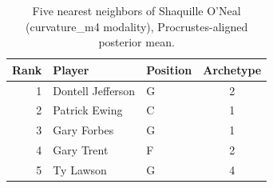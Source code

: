 \begin{table}[htbp]
  \centering\small
  \begin{tabular}{rllc}
    \toprule
    Rank & Player & Position & Archetype \\
    \midrule
    1 & Dontell Jefferson & G & 2 \\
    2 & Patrick Ewing & C & 1 \\
    3 & Gary Forbes & G & 1 \\
    4 & Gary Trent & F & 2 \\
    5 & Ty Lawson & G & 4 \\
    \bottomrule
  \end{tabular}
  \caption{Five nearest neighbors of Shaquille O'Neal (curvature_m4 modality), Procrustes-aligned posterior mean.}
  \label{tab:Shaquille_O_Neal_neighbors_curvature_m4}
\end{table}

